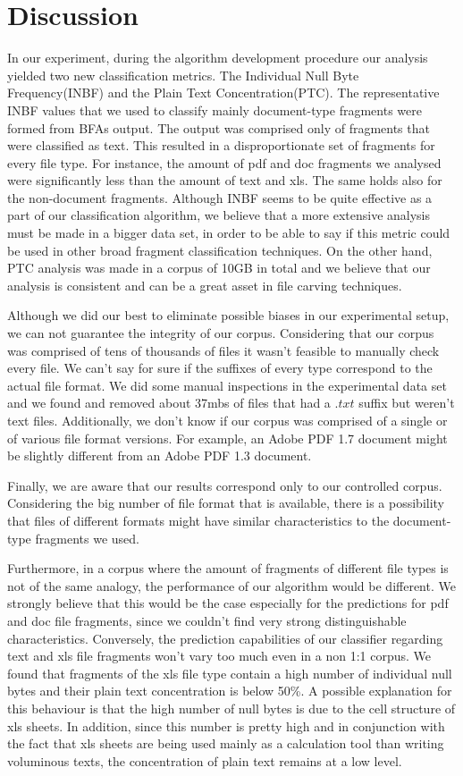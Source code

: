 \chapter{Discussion}
In our experiment, during the algorithm development procedure our analysis yielded two new classification metrics. The Individual Null Byte Frequency(INBF) and the Plain Text Concentration(PTC). The representative INBF values that we used to classify mainly document-type fragments were formed from BFAs output. The output was comprised only of fragments that were classified as text. This resulted in a disproportionate set of fragments for every file type. For instance, the amount of pdf and doc fragments we analysed were significantly less than the amount of text and xls. The same holds also for the non-document fragments. Although INBF seems to be quite effective as a part of our classification algorithm, we believe that a more extensive analysis must be made in a bigger data set, in order to be able to say if this metric could be used in other broad fragment classification techniques. On the other hand, PTC analysis was made in a corpus of 10GB in total and we believe that our analysis is consistent and can be a great asset in file carving techniques.

Although we did our best to eliminate possible biases in our experimental setup, we can not guarantee the integrity of our corpus. Considering that our corpus was comprised of tens of thousands of files it wasn't feasible to manually check every file. We can't say for sure if the suffixes of every type  correspond to the actual file format. We did some manual inspections in the experimental data set and we found and removed about 37mbs of files that had a $.txt$ suffix but weren't text files. Additionally, we don't know if our corpus was comprised of a single or of various file format versions. For example, an Adobe PDF 1.7 document might be slightly different from an Adobe PDF 1.3 document.

Finally, we are aware that our results correspond only to our controlled corpus. Considering the big number of file format that is available, there is a possibility that files of different formats might have similar characteristics to the document-type fragments we used.

Furthermore, in a corpus where the amount of fragments of different file types is not of the same analogy, the performance of our algorithm would be different. We strongly believe that this would be the case especially for the predictions for pdf and doc file fragments, since we couldn't find very strong distinguishable characteristics. Conversely, the prediction capabilities of our classifier regarding text and xls file fragments won't vary too much even in a non 1:1 corpus. We found that fragments of the xls file type contain a high number of individual null bytes and their plain text concentration is below 50\%. A possible explanation for this behaviour is that the high number of null bytes is due to the cell structure of xls sheets. In addition, since this number is pretty high and in conjunction with the fact that xls sheets are being used mainly as a calculation tool than writing voluminous texts, the concentration of plain text remains at a low level.

